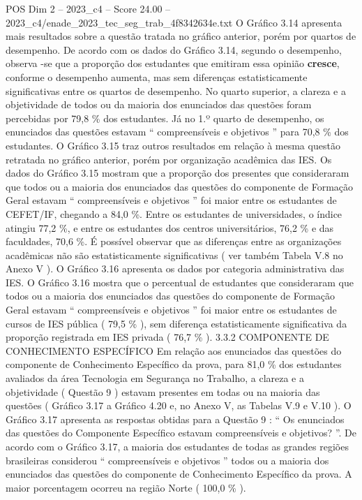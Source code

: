 \begin{textsample}{POS Dim 2 – 2023\_c4 – Score 24.00 – 2023\_c4/enade\_2023\_tec\_seg\_trab\_4f8342634e.txt}
O Gráfico 3.14 apresenta mais resultados sobre a questão tratada no gráfico anterior, porém por quartos de desempenho.
De acordo com os dados do Gráfico 3.14, segundo o desempenho, observa -se que a proporção dos estudantes que emitiram essa opinião \textbf{cresce}, conforme o desempenho aumenta, mas sem diferenças estatisticamente significativas entre os quartos de desempenho.
No quarto superior, a clareza e a objetividade de todos ou da maioria dos enunciados das questões foram percebidas por 79,8 \% dos estudantes.
Já no 1.º quarto de desempenho, os enunciados das questões estavam “ compreensíveis e objetivos ” para 70,8 \% dos estudantes.
O Gráfico 3.15 traz outros resultados em relação à mesma questão retratada no gráfico anterior, porém por organização acadêmica das IES.
Os dados do Gráfico 3.15 mostram que a proporção dos presentes que consideraram que todos ou a maioria dos enunciados das questões do componente de Formação Geral estavam “ compreensíveis e objetivos ” foi maior entre os estudantes de CEFET/IF, chegando a 84,0 \%.
Entre os estudantes de universidades, o índice atingiu 77,2 \%, e entre os estudantes dos centros universitários, 76,2 \% e das faculdades, 70,6 \%.
É possível observar que as diferenças entre as organizações acadêmicas não são estatisticamente significativas ( ver também Tabela V.8 no Anexo V ).
O Gráfico 3.16 apresenta os dados por categoria administrativa das IES.
O Gráfico 3.16 mostra que o percentual de estudantes que consideraram que todos ou a maioria dos enunciados das questões do componente de Formação Geral estavam “ compreensíveis e objetivos ” foi maior entre os estudantes de cursos de IES pública ( 79,5 \% ), sem diferença estatisticamente significativa da proporção registrada em IES privada ( 76,7 \% ). 3.3.2 COMPONENTE DE CONHECIMENTO ESPECÍFICO Em relação aos enunciados das questões do componente de Conhecimento Específico da prova, para 81,0 \% dos estudantes avaliados da área Tecnologia em Segurança no Trabalho, a clareza e a objetividade ( Questão 9 ) estavam presentes em todas ou na maioria das questões ( Gráfico 3.17 a Gráfico 4.20 e, no Anexo V, as Tabelas V.9 e V.10 ).
O Gráfico 3.17 apresenta as respostas obtidas para a Questão 9 : “ Os enunciados das questões do Componente Específico estavam compreensíveis e objetivos? ”.
De acordo com o Gráfico 3.17, a maioria dos estudantes de todas as grandes regiões brasileiras considerou “ compreensíveis e objetivos ” todos ou a maioria dos enunciados das questões do componente de Conhecimento Específico da prova.
A maior porcentagem ocorreu na região Norte ( 100,0 \% ).

\end{textsample}
